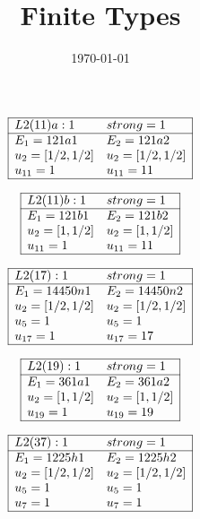 \documentclass[11pt]{article}
\theoremstyle{definition}
\begin{document}
\title{Finite Types}
\date{\today}
\maketitle
$$
 \begin{array}{|ll|} 
\hline 
  L2(11)a:1  & strong=1\\
\hline
 E_1=121a1 & E_2=121a2 \\
  u_{2}=[ 1/2, 1/2 ]&  u_{2}=[ 1/2, 1/2 ]\\
  u_{11}=1&  u_{11}=11\\
\hline
\end{array}
 $$


$$
 \begin{array}{|ll|} 
\hline 
  L2(11)b:1  & strong=1\\
\hline
 E_1=121b1 & E_2=121b2 \\
  u_{2}=[ 1, 1/2 ]&  u_{2}=[ 1, 1/2 ]\\
  u_{11}=1&  u_{11}=11\\
\hline
\end{array}
 $$


$$
 \begin{array}{|ll|} 
\hline 
  L2(17):1  & strong=1\\
\hline
 E_1=14450n1 & E_2=14450n2 \\
  u_{2}=[ 1/2, 1/2 ]&  u_{2}=[ 1/2, 1/2 ]\\
  u_{5}=1&  u_{5}=1\\
  u_{17}=1&  u_{17}=17\\
\hline
\end{array}
 $$


$$
 \begin{array}{|ll|} 
\hline 
  L2(19):1  & strong=1\\
\hline
 E_1=361a1 & E_2=361a2 \\
  u_{2}=[ 1, 1/2 ]&  u_{2}=[ 1, 1/2 ]\\
  u_{19}=1&  u_{19}=19\\
\hline
\end{array}
 $$


$$
 \begin{array}{|ll|} 
\hline 
  L2(37):1  & strong=1\\
\hline
 E_1=1225h1 & E_2=1225h2 \\
  u_{2}=[ 1/2, 1/2 ]&  u_{2}=[ 1/2, 1/2 ]\\
  u_{5}=1&  u_{5}=1\\
  u_{7}=1&  u_{7}=1\\
\hline
\end{array}
 $$
\end{document}
